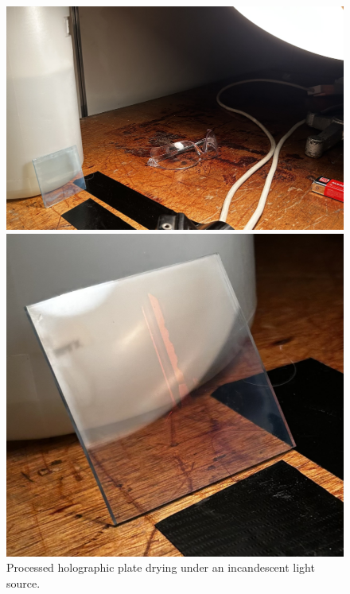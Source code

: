 \documentclass[12pt]{article}
\begin{document}
\begin{figure}[H]
    \centering
    \begin{minipage}{.55\textwidth}
        \includegraphics[width=\linewidth]{holo drying.jpeg}
    \end{minipage}
    \hspace{-.5em}
    \begin{minipage}{.385\textwidth}
        \includegraphics[width=\linewidth]{maybe this is actually holo drying.jpeg}
    \end{minipage}
    \caption{\centering Processed holographic plate drying under an incandescent light source.}
    \label{fig:12}
\end{figure}
\end{document}
